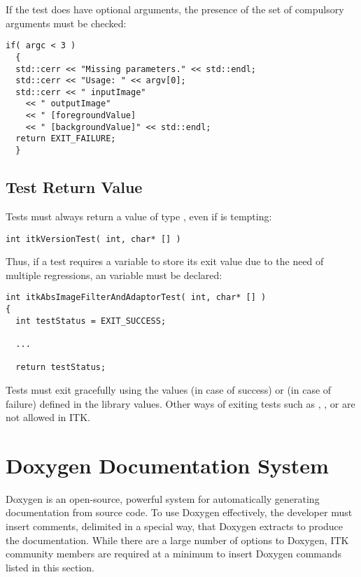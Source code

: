 If the test does have optional arguments, the presence of the set of compulsory
arguments must be checked:

\small
\begin{verbatim}
if( argc < 3 )
  {
  std::cerr << "Missing parameters." << std::endl;
  std::cerr << "Usage: " << argv[0];
  std::cerr << " inputImage"
    << " outputImage"
    << " [foregroundValue]
    << " [backgroundValue]" << std::endl;
  return EXIT_FAILURE;
  }
\end{verbatim}
\normalsize


\subsection{Test Return Value}
\label{subsec:TestReturnValue}

Tests must always return a value of type ,
even if  is tempting:

\small
\begin{verbatim}
int itkVersionTest( int, char* [] )
\end{verbatim}
\normalsize

Thus, if a test requires a variable to store its exit value due to the need
of multiple regressions, an  variable must be declared:

\small
\begin{verbatim}
int itkAbsImageFilterAndAdaptorTest( int, char* [] )
{
  int testStatus = EXIT_SUCCESS;

  ...

  return testStatus;
\end{verbatim}
\normalsize

Tests must exit gracefully using the values  (in case of
success) or  (in case of failure) defined in the
 library values. Other ways of exiting tests such as
, , or  are not
allowed in ITK.


\section{Doxygen Documentation System}
\label{sec:DoxygenDocumentationSystem}

Doxygen is an open-source, powerful system for automatically generating
documentation from source code. To use Doxygen effectively, the developer must
insert comments, delimited in a special way, that Doxygen extracts to produce
the documentation. While there are a large number of options to Doxygen,
ITK community members are required at a minimum to insert Doxygen commands
listed in this section.

